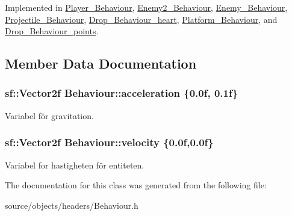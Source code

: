 Implemented in \hyperlink{classPlayer__Behaviour_aa88f449e71197691e1166e985f165fa6}{Player\+\_\+\+Behaviour}, \hyperlink{classEnemy2__Behaviour_a0979bade3f9b3ff9dca3c6b970a5ef63}{Enemy2\+\_\+\+Behaviour}, \hyperlink{classEnemy__Behaviour_a19097e215910b3fd8cf9e002a6f7f642}{Enemy\+\_\+\+Behaviour}, \hyperlink{classProjectile__Behaviour_aed04c8c1f5ae6aca08bdf05b6248d24a}{Projectile\+\_\+\+Behaviour}, \hyperlink{classDrop__Behaviour__heart_a38a5d26b313a84e4428093d537a446fb}{Drop\+\_\+\+Behaviour\+\_\+heart}, \hyperlink{classPlatform__Behaviour_a8a1b458d89bca1e1955aebc2fb44d052}{Platform\+\_\+\+Behaviour}, and \hyperlink{classDrop__Behaviour__points_a37b589ed4fe56c64b1c1b0bf3605e4ba}{Drop\+\_\+\+Behaviour\+\_\+points}.



\subsection{Member Data Documentation}
\hypertarget{classBehaviour_ac17cf81ceee6a44e8a8ec6ee810c9fd3}{
\subsubsection[{acceleration}]{\setlength{\rightskip}{0pt plus 5cm}sf\+::\+Vector2f Behaviour\+::acceleration \{0.\+0f, 0.\+1f\}\hspace{0.3cm}{\ttfamily [protected]}}}\label{classBehaviour_ac17cf81ceee6a44e8a8ec6ee810c9fd3}


Variabel för gravitation. 

\hypertarget{classBehaviour_a1d52096cf20a59890f7705acbaccf88a}{
\subsubsection[{velocity}]{\setlength{\rightskip}{0pt plus 5cm}sf\+::\+Vector2f Behaviour\+::velocity \{0.\+0f,0.\+0f\}\hspace{0.3cm}{\ttfamily [protected]}}}\label{classBehaviour_a1d52096cf20a59890f7705acbaccf88a}


Variabel for hastigheten för entiteten. 



The documentation for this class was generated from the following file\+:\begin{DoxyCompactItemize}
\item 
source/objects/headers/Behaviour.\+h\end{DoxyCompactItemize}
